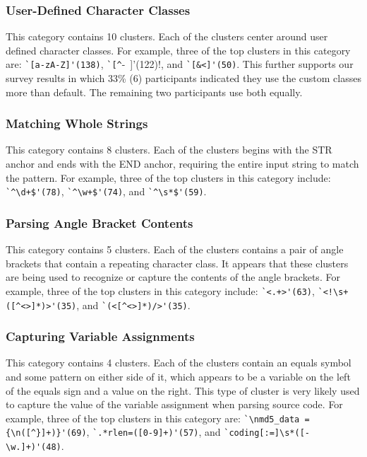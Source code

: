 \subsubsection{User-Defined Character Classes}
This category contains 10 clusters. Each of the clusters center around user defined character classes. For example, three of the top clusters in this category are:
\verb!`[a-zA-Z]'(138)!, \verb!`[^!-~]'(122)!, and \verb!`[&<]'(50)!. This further supports our survey results in which 33\% (6) participants indicated they use the custom classes more than default. The remaining two participants use both equally.


\subsubsection{ Matching Whole Strings}
This category contains 8 clusters. Each of the clusters begins with the STR anchor and ends with the END anchor, requiring the entire input string to match the pattern. For example, three of the top clusters in this category include:
\verb!`^\d+$'(78)!, \verb!`^\w+$'(74)!, and \verb!`^\s*$'(59)!.


\subsubsection{Parsing Angle Bracket Contents}
This category contains 5 clusters. Each of the clusters contains a pair of angle brackets that contain a repeating character class.  It appears that these clusters are being used to recognize or capture the contents of the angle brackets.  For example, three of the top clusters in this category include:
\verb!`<.+>'(63)!, \verb?`<!\s+([^<>]*)>'(35)?, and \verb!`(<[^<>]*)/>'(35)!. %

\subsubsection{Capturing Variable Assignments}
This category contains 4 clusters. Each of the clusters contain an equals symbol and some pattern on either side of it, which appears to be a variable on the left of the equals sign and a value on the right.  This type of cluster is very likely used to capture the value of the variable assignment when parsing source code. For example, three of the top clusters in this category are:
\verb!`\nmd5_data = {\n([^}]+)}'(69)!, \verb!`.*rlen=([0-9]+)'(57)!, and \verb!`coding[:=]\s*([-\w.]+)'(48)!.


